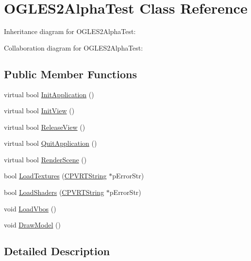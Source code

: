 \hypertarget{class_o_g_l_e_s2_alpha_test}{\section{O\+G\+L\+E\+S2\+Alpha\+Test Class Reference}
\label{class_o_g_l_e_s2_alpha_test}
}


Inheritance diagram for O\+G\+L\+E\+S2\+Alpha\+Test\+:


Collaboration diagram for O\+G\+L\+E\+S2\+Alpha\+Test\+:
\subsection*{Public Member Functions}
\begin{DoxyCompactItemize}
\item 
virtual bool \hyperlink{class_o_g_l_e_s2_alpha_test_af1af768a4f597aa09438c26e4a1c5292}{Init\+Application} ()
\item 
virtual bool \hyperlink{class_o_g_l_e_s2_alpha_test_a33622abe768ddf0e2208874674942873}{Init\+View} ()
\item 
virtual bool \hyperlink{class_o_g_l_e_s2_alpha_test_ac6d696f783500713da02ff4d3feb2cf9}{Release\+View} ()
\item 
virtual bool \hyperlink{class_o_g_l_e_s2_alpha_test_aafd5dd1e45062c973e2716e1a964dc8d}{Quit\+Application} ()
\item 
virtual bool \hyperlink{class_o_g_l_e_s2_alpha_test_a18b0d1e0071d8b532ad3a65fd57ddaac}{Render\+Scene} ()
\item 
bool \hyperlink{class_o_g_l_e_s2_alpha_test_ace2adc08f5c59b3057fcfb35c8f41894}{Load\+Textures} (\hyperlink{class_c_p_v_r_t_string}{C\+P\+V\+R\+T\+String} $\ast$p\+Error\+Str)
\item 
bool \hyperlink{class_o_g_l_e_s2_alpha_test_a14484b426b6816b487cccd12bbda9b73}{Load\+Shaders} (\hyperlink{class_c_p_v_r_t_string}{C\+P\+V\+R\+T\+String} $\ast$p\+Error\+Str)
\item 
void \hyperlink{class_o_g_l_e_s2_alpha_test_a0e593193a7c21f9a0a2946d37e9cd10d}{Load\+Vbos} ()
\item 
void \hyperlink{class_o_g_l_e_s2_alpha_test_acf790082ceb770d3cc5f9de702b9d584}{Draw\+Model} ()
\end{DoxyCompactItemize}


\subsection{Detailed Description}


